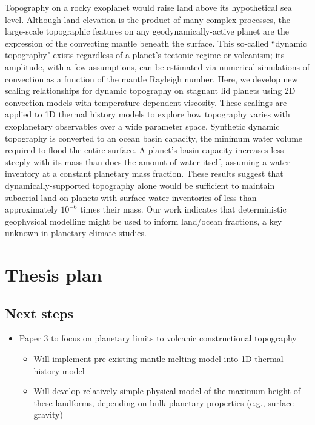 \documentclass[10pt,a4paper]{article}
\begin{document}
Topography on a rocky exoplanet would raise land above its hypothetical sea level. Although land elevation is the product of many complex processes, the large-scale topographic features on any geodynamically-active planet are the expression of the convecting mantle beneath the surface. This so-called ``dynamic topography" exists regardless of a planet's tectonic regime or volcanism; its amplitude, with a few assumptions, can be estimated via numerical simulations of convection as a function of the mantle Rayleigh number. Here, we develop new scaling relationships for dynamic topography on stagnant lid planets using 2D convection models with temperature-dependent viscosity. These scalings are applied to 1D thermal history models to explore how topography varies with exoplanetary observables over a wide parameter space. Synthetic dynamic topography is converted to an ocean basin capacity, the minimum water volume required to flood the entire surface. A planet's basin capacity increases less steeply with its mass than does the amount of water itself, assuming a water inventory at a constant planetary mass fraction. These results suggest that dynamically-supported topography alone would be sufficient to maintain subaerial land on planets with surface water inventories of less than approximately $10^{-6}$ times their mass. Our work indicates that deterministic geophysical modelling might be used to inform land/ocean fractions, a key unknown in planetary climate studies.

\section{Thesis plan}

\subsection{Next steps}

\begin{itemize}
\item Paper 3 to focus on planetary limits to volcanic constructional topography
\begin{itemize}
\item Will implement pre-existing mantle melting model into 1D thermal history model
\item Will develop relatively simple physical model of the maximum height of these landforms, depending on bulk planetary properties (e.g., surface gravity)
\end{itemize}
\end{itemize}
\end{document}
